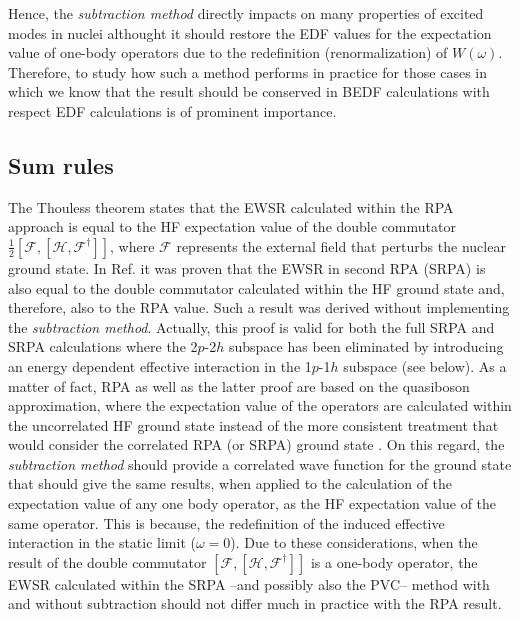 \documentclass[12pt,a4paper,final]{iopart}
\begin{document}
Hence, the {\it subtraction method} directly impacts on many properties of excited modes in nuclei althought it should restore the EDF values for the expectation value of one-body operators due to the redefinition (renormalization) of $W(\omega)$. Therefore, to study how such a method performs in practice for those cases in which we know that the result should be conserved in BEDF calculations with respect EDF calculations is of prominent importance.

\subsection{Sum rules}

The Thouless theorem \cite{thouless1961} states that the EWSR calculated within the RPA approach is equal to the HF expectation value of the double commutator $\frac{1}{2}[\mathcal{F},[\mathcal{H},\mathcal{F}^\dag]]$, where $\mathcal{F}$ represents the external field that perturbs the nuclear ground state. In Ref.\cite{yannouleas1987} it was proven that the EWSR in second RPA (SRPA) \cite{rowe,wambach1990} is also equal to the double commutator calculated within the HF ground state and, therefore, also to the RPA value. Such a result was derived without implementing the {\it subtraction method}. Actually, this proof is valid for both the full SRPA and SRPA calculations where the 2$p$-2$h$ subspace has been eliminated by introducing an energy dependent effective interaction in the 1$p$-1$h$ subspace \cite{wambach1990} (see below). %
As a matter of fact, RPA as well as the latter proof are based on the quasiboson approximation, where the expectation value of the operators are calculated within the uncorrelated HF ground state instead of the more consistent treatment that would consider the correlated RPA (or SRPA) ground state \cite{catara1996}. On this regard, the {\it subtraction method} should provide a correlated wave function for the ground state that should give the same results, when applied to the calculation of the expectation value of any one body operator, as the HF expectation value of the same operator. This is because, the redefinition of the induced effective interaction in the static limit ($\omega=0$). Due to these considerations, when the result of the double commutator $[\mathcal{F},[\mathcal{H},\mathcal{F}^\dag]]$ is a one-body operator, the EWSR calculated within the SRPA --and possibly also the PVC-- method with and without subtraction should not differ much in practice with the RPA result.
\end{document}
